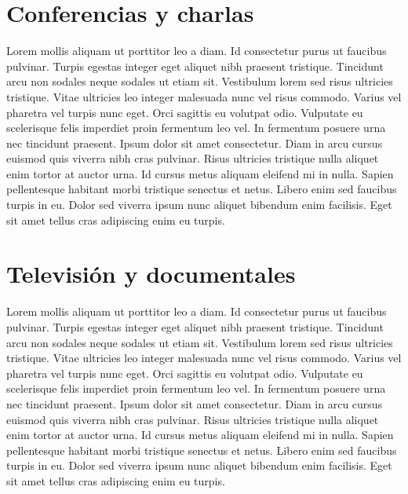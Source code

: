 \section{Conferencias y charlas}
Lorem mollis aliquam ut porttitor leo a diam. Id consectetur purus ut faucibus pulvinar. Turpis egestas integer eget aliquet nibh praesent tristique. Tincidunt arcu non sodales neque sodales ut etiam sit. Vestibulum lorem sed risus ultricies tristique. Vitae ultricies leo integer malesuada nunc vel risus commodo. Varius vel pharetra vel turpis nunc eget. Orci sagittis eu volutpat odio. Vulputate eu scelerisque felis imperdiet proin fermentum leo vel. In fermentum posuere urna nec tincidunt praesent. Ipsum dolor sit amet consectetur. Diam in arcu cursus euismod quis viverra nibh cras pulvinar. Risus ultricies tristique nulla aliquet enim tortor at auctor urna. Id cursus metus aliquam eleifend mi in nulla. Sapien pellentesque habitant morbi tristique senectus et netus. Libero enim sed faucibus turpis in eu. Dolor sed viverra ipsum nunc aliquet bibendum enim facilisis. Eget sit amet tellus cras adipiscing enim eu turpis.

\section{Televisión y documentales}
Lorem mollis aliquam ut porttitor leo a diam. Id consectetur purus ut faucibus pulvinar. Turpis egestas integer eget aliquet nibh praesent tristique. Tincidunt arcu non sodales neque sodales ut etiam sit. Vestibulum lorem sed risus ultricies tristique. Vitae ultricies leo integer malesuada nunc vel risus commodo. Varius vel pharetra vel turpis nunc eget. Orci sagittis eu volutpat odio. Vulputate eu scelerisque felis imperdiet proin fermentum leo vel. In fermentum posuere urna nec tincidunt praesent. Ipsum dolor sit amet consectetur. Diam in arcu cursus euismod quis viverra nibh cras pulvinar. Risus ultricies tristique nulla aliquet enim tortor at auctor urna. Id cursus metus aliquam eleifend mi in nulla. Sapien pellentesque habitant morbi tristique senectus et netus. Libero enim sed faucibus turpis in eu. Dolor sed viverra ipsum nunc aliquet bibendum enim facilisis. Eget sit amet tellus cras adipiscing enim eu turpis.

